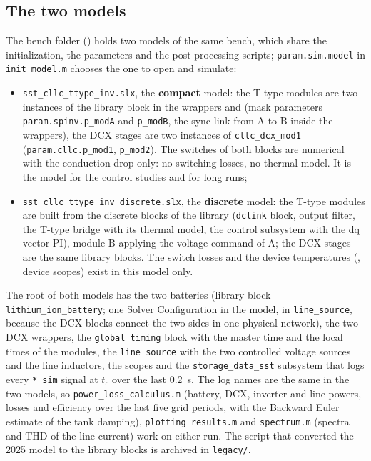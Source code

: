 \documentclass[12pt,a4paper]{scrartcl}
\begin{document}
\begin{onehalfspace}
\subsection{The two models}
\label{sec:bench2026_models}
The bench folder () holds two models of the same bench, which share the initialization, the parameters and the post-processing scripts; \texttt{param.sim.model} in \texttt{init\_model.m} chooses the one to open and simulate:

\begin{itemize}[nosep]
	\item \texttt{sst\_cllc\_ttype\_inv.slx}, the \textbf{compact} model: the T-type modules are two instances of the library block  in the wrappers  and  (mask parameters \texttt{param.spinv.p\_modA} and \texttt{p\_modB}, the sync link from A to B inside the wrappers), the DCX stages are two instances of \texttt{cllc\_dcx\_mod1} (\texttt{param.cllc.p\_mod1}, \texttt{p\_mod2}). The switches of both blocks are numerical with the conduction drop only: no switching losses, no thermal model. It is the model for the control studies and for long runs;
	\item \texttt{sst\_cllc\_ttype\_inv\_discrete.slx}, the \textbf{discrete} model: the T-type modules  are built from the discrete blocks of the library (\texttt{dclink} block, output filter, the T-type bridge  with its thermal model, the control subsystem with the dq vector PI), module B applying the voltage command of A; the DCX stages are the same library blocks. The switch losses and the device temperatures (, device scopes) exist in this model only.
\end{itemize}

\noindent The root of both models has the two batteries (library block \texttt{lithium\_ion\_battery}; one Solver Configuration in the model, in \texttt{line\_source}, because the DCX blocks connect the two sides in one physical network), the two DCX wrappers, the \texttt{global timing} block with the master time and the local times of the modules, the \texttt{line\_source} with the two controlled voltage sources and the line inductors, the scopes and the \texttt{storage\_data\_sst} subsystem that logs every \texttt{*\_sim} signal at $t_c$ over the last \SI{0.2}{\second}. The log names are the same in the two models, so \texttt{power\_loss\_calculus.m} (battery, DCX, inverter and line powers, losses and efficiency over the last five grid periods, with the Backward Euler estimate of the tank damping), \texttt{plotting\_results.m} and \texttt{spectrum.m} (spectra and THD of the line current) work on either run. The script that converted the 2025 model to the library blocks is archived in \texttt{legacy/}.


\end{onehalfspace}
\end{document}
